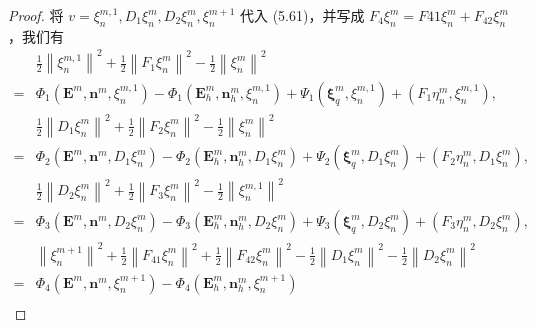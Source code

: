 \begin{proof}
    将 $v=\xi_n^{m,1}, D_1 \xi_n^m, D_2 \xi_n^m, \xi_n^{m+1}$ 代入 (5.61)，并写成 $F_4 \xi_n^m = F{41} \xi_n^m + F_{42} \xi_n^m$，我们有
    \begin{align}
          & \frac{1}{2}\left\|\xi_{n}^{m, 1}\right\|^{2}+\frac{1}{2}\left\|F_{1} \xi_{n}^{m}\right\|^{2}-\frac{1}{2}\left\|\xi_{n}^{m}\right\|^{2} \nonumber                                                                                                                                           \\
        = & \Phi_{1}\left(\boldsymbol{E}^{m}, \boldsymbol{n}^{m}, \xi_{n}^{m, 1}\right)-\Phi_{1}\left(\boldsymbol{E}_{h}^{m}, \boldsymbol{n}_{h}^{m}, \xi_{n}^{m, 1}\right)+\Psi_{1}\left(\boldsymbol{\xi}_{q}^{m}, \xi_{n}^{m, 1}\right)+\left(F_{1} \eta_{n}^{m}, \xi_{n}^{m, 1}\right),             \\
          & \frac{1}{2}\left\|D_{1} \xi_{n}^{m}\right\|^{2}+\frac{1}{2}\left\|F_{2} \xi_{n}^{m}\right\|^{2}-\frac{1}{2}\left\|\xi_{n}^{m}\right\|^{2}\nonumber                                                                                                                                         \\
        = & \Phi_{2}\left(\boldsymbol{E}^{m}, \boldsymbol{n}^{m}, D_{1} \xi_{n}^{m}\right)-\Phi_{2}\left(\boldsymbol{E}_{h}^{m}, \boldsymbol{n}_{h}^{m}, D_{1} \xi_{n}^{m}\right)+\Psi_{2}\left(\boldsymbol{\xi}_{q}^{m}, D_{1} \xi_{n}^{m}\right)+\left(F_{2} \eta_{n}^{m}, D_{1} \xi_{n}^{m}\right), \\
          & \frac{1}{2}\left\|D_{2} \xi_{n}^{m}\right\|^{2}+\frac{1}{2}\left\|F_{3} \xi_{n}^{m}\right\|^{2}-\frac{1}{2}\left\|\xi_{n}^{m, 1}\right\|^{2} \nonumber                                                                                                                                     \\
        = & \Phi_{3}\left(\boldsymbol{E}^{m}, \boldsymbol{n}^{m}, D_{2} \xi_{n}^{m}\right)-\Phi_{3}\left(\boldsymbol{E}_{h}^{m}, \boldsymbol{n}_{h}^{m}, D_{2} \xi_{n}^{m}\right)+\Psi_{3}\left(\boldsymbol{\xi}_{q}^{m}, D_{2} \xi_{n}^{m}\right)+\left(F_{3} \eta_{n}^{m}, D_{2} \xi_{n}^{m}\right), \\
          & \left\|\xi_{n}^{m+1}\right\|^{2}+\frac{1}{2}\left\|F_{41} \xi_{n}^{m}\right\|^{2}+\frac{1}{2}\left\|F_{42} \xi_{n}^{m}\right\|^{2}-\frac{1}{2}\left\|D_{1} \xi_{n}^{m}\right\|^{2}-\frac{1}{2}\left\|D_{2} \xi_{n}^{m}\right\|^{2}\nonumber                                                \\
        = & \Phi_{4}\left(\boldsymbol{E}^{m}, \boldsymbol{n}^{m}, \xi_{n}^{m+1}\right)-\Phi_{4}\left(\boldsymbol{E}_{h}^{m}, \boldsymbol{n}_{h}^{m}, \xi_{n}^{m+1}\right) \nonumber                                                                                                                    \\

\end{align}
\end{proof}
